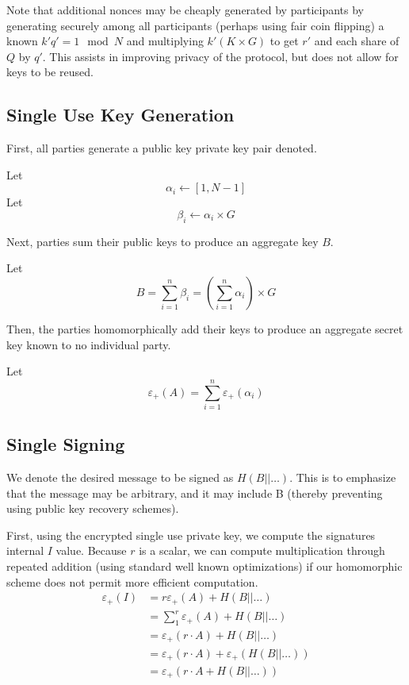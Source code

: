\documentclass{article}
\newcommand{\addencrypt}{\varepsilon_{+}}
\begin{document}
Note that additional nonces may be cheaply generated by
participants by generating securely among all participants (perhaps using fair
coin flipping) a known $k'q' = 1 \mod N$ and multiplying $k'(K\times G)$ to get
$r'$ and each share of $Q$ by $q'$. This assists in improving privacy of the
protocol, but does not allow for keys to be reused.


\subsection{Single Use Key Generation}

First, all parties generate a public key private key pair denoted.

Let $$\alpha_i \leftarrow [1, N-1]$$
Let $$\beta_i \leftarrow \alpha_i \times G$$

Next, parties sum their public keys to produce an aggregate key $B$.

Let $$ B = \sum\limits_{i = 1}^n \beta_i = \left(\sum\limits_{i=1}^n \alpha_i\right) \times G$$


Then, the parties homomorphically add their keys to produce an aggregate secret
key known to no individual party.

Let $$\addencrypt(A) = \sum\limits_{i=1}^n \addencrypt(\alpha_i)$$

\subsection{Single Signing}

We denote the desired message to be signed as $H(B || \ldots)$. This is to
emphasize that the message may be arbitrary, and it may include B (thereby
preventing using public key recovery schemes).


First, using the encrypted single use private key, we compute the signatures
internal $I$ value. Because $r$ is a scalar, we can compute multiplication
through repeated addition (using standard well known optimizations) if our
homomorphic scheme does not permit  more efficient computation.
\begin{equation*}
    \begin{split}
        \addencrypt(I) & = r\addencrypt(A) + H(B || \ldots) \\
        & = \sum_{1}^r \addencrypt(A) + H(B || \ldots) \\
        & = \addencrypt(r \cdot A) + H(B || \ldots) \\
        &= \addencrypt(r\cdot A) + \addencrypt(H(B || \ldots)) \\
        &= \addencrypt(r\cdot A + H(B || \ldots)) 
    \end{split}
\end{equation*}
\end{document}
